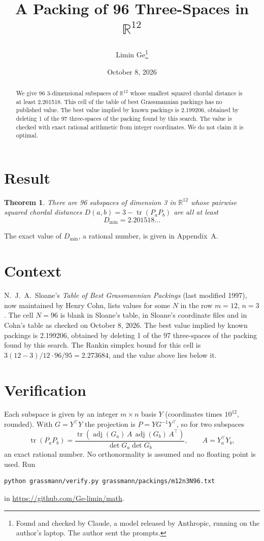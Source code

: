 \documentclass[11pt,a4paper]{article}
\title{A Packing of 96 Three-Spaces in $\mathbb{R}^{12}$}
\author{Limin Ge\thanks{Found and checked by Claude, a model released by Anthropic, running on the author's laptop. The author sent the prompts.}}
\date{October 8, 2026}
\newtheorem*{theorem}{Theorem}
\begin{document}
\maketitle
\begin{abstract}
We give 96 3-dimensional subspaces of $\mathbb{R}^{12}$ whose smallest squared chordal distance is at least 2.201518. This cell of the table of best Grassmannian packings has no published value. The best value implied by known packings is 2.199206, obtained by deleting 1 of the 97 three-spaces of the packing found by this search. The value is checked with exact rational arithmetic from integer coordinates. We do not claim it is optimal.
\end{abstract}

\section{Result}
\begin{theorem}
There are 96 subspaces of dimension 3 in $\mathbb{R}^{12}$ whose pairwise squared chordal distances $D(a,b) = 3 - \operatorname{tr}(P_aP_b)$ are all at least
\[ D_{\min} = 2.201518\ldots \]
\end{theorem}
The exact value of $D_{\min}$, a rational number, is given in Appendix~A.


\section{Context}
N.~J.~A.~Sloane's \emph{Table of Best Grassmannian Packings} (last modified 1997), now maintained by Henry Cohn, lists values for some $N$ in the row $m=12$, $n=3$. The cell $N=96$ is blank in Sloane's table, in Sloane's coordinate files and in Cohn's table as checked on October 8, 2026. The best value implied by known packings is 2.199206, obtained by deleting 1 of the 97 three-spaces of the packing found by this search. The Rankin simplex bound for this cell is $3(12-3)/12\cdot 96/95 = 2.273684$, and the value above lies below it.


\section{Verification}
Each subspace is given by an integer $m\times n$ basis $Y$ (coordinates times $10^{12}$, rounded). With $G=Y^\top Y$ the projection is $P=YG^{-1}Y^\top$, so for two subspaces
\[ \operatorname{tr}(P_aP_b)=\frac{\operatorname{tr}(\operatorname{adj}(G_a)\,A\,\operatorname{adj}(G_b)\,A^\top)}{\det G_a\det G_b},\qquad A=Y_a^\top Y_b, \]
an exact rational number. No orthonormality is assumed and no floating point is used. Run
\begin{verbatim}
python grassmann/verify.py grassmann/packings/m12n3N96.txt
\end{verbatim}
in \url{https://github.com/Ge-limin/math}.
\end{document}
